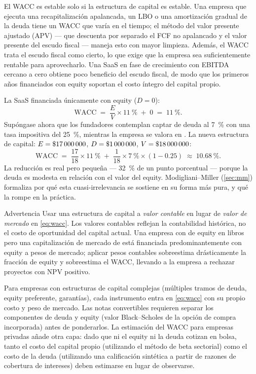 El WACC es estable solo si la estructura de capital es estable. Una empresa que ejecuta una
recapitalización apalancada, un LBO o una amortización gradual de la deuda tiene un WACC que varía en
el tiempo; el método del valor presente ajustado (APV) --- que descuenta por separado el FCF no
apalancado y el valor presente del escudo fiscal --- maneja esto con mayor limpieza. Además, el WACC
trata el escudo fiscal como cierto, lo que exige que la empresa sea suficientemente rentable para
aprovecharlo. Una SaaS en fase de crecimiento con EBITDA cercano a cero obtiene poco beneficio del
escudo fiscal, de modo que los primeros años financiados con equity soportan el costo íntegro del
capital propio.

\begin{example}
La SaaS financiada únicamente con equity (\(D=0\)):
\[
  \mathrm{WACC} \;=\; \frac{E}{V}\times\qty{11}{\percent} \;+\; 0
               \;=\; \qty{11}{\percent}.
\]
Supóngase ahora que los fundadores contemplan captar  de deuda al \qty{7}{\percent}
con una tasa impositiva del \qty{25}{\percent}, mientras la empresa se valora en .
La nueva estructura de capital: \(E=\$\num{17000000}\), \(D=\$\num{1000000}\),
\(V=\$\num{18000000}\):
\[
  \mathrm{WACC} \;=\; \frac{17}{18}\times\qty{11}{\percent}
               \;+\; \frac{1}{18}\times\qty{7}{\percent}\times(1-0.25)
               \;\approx\; \qty{10.68}{\percent}.
\]
La reducción es real pero pequeña --- \qty{32}{\percent} de un punto porcentual ---
porque la deuda es modesta en relación con el valor del equity. Modigliani–Miller
(\cref{sec:mm}) formaliza por qué esta cuasi-irrelevancia se sostiene en su forma más pura,
y qué la rompe en la práctica.
\end{example}

\begin{admonition}{Advertencia}
Usar una estructura de capital a \emph{valor contable} en lugar de \emph{valor de mercado} en
\cref{eq:wacc}. Los valores contables reflejan la contabilidad histórica, no el costo de oportunidad
del capital actual. Una empresa con  de equity en libros pero una capitalización de
mercado de  está financiada predominantemente con equity a pesos de mercado;
aplicar pesos contables sobreestima drásticamente la fracción de equity y sobreestima el WACC,
llevando a la empresa a rechazar proyectos con NPV positivo.
\end{admonition}

Para empresas con estructuras de capital complejas (múltiples tramos de deuda, equity preferente,
garantías), cada instrumento entra en \cref{eq:wacc} con su propio costo y peso de mercado.
Las notas convertibles requieren separar los componentes de deuda y equity (valor Black--Scholes
de la opción de compra incorporada) antes de ponderarlos. La estimación del WACC para empresas
privadas añade otra capa: dado que ni el equity ni la deuda cotizan en bolsa, tanto el costo del
capital propio (utilizando el método de beta sectorial) como el costo de la deuda (utilizando una
calificación sintética a partir de razones de cobertura de intereses) deben estimarse en lugar de
observarse.

